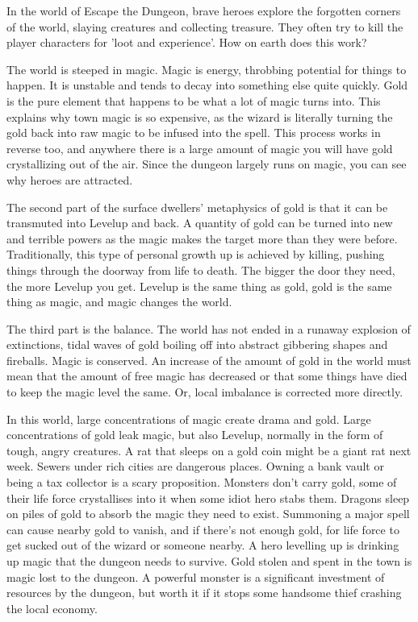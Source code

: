 \documentclass{tufte-book}
\begin{document}
In the world of Escape the Dungeon, brave heroes explore the forgotten corners of the world, slaying creatures and collecting treasure.  They often try to kill the player characters for 'loot and experience'. How on earth does this work?

The world is steeped in magic. Magic is energy, throbbing potential for things to happen. It is unstable and tends to decay into something else quite quickly. Gold is the pure element that happens to be what a lot of magic turns into. This explains why town magic is so expensive, as the wizard is literally turning the gold back into raw magic to be infused into the spell. This process works in reverse too, and anywhere there is a large amount of magic you will have gold crystallizing out of the air. Since the dungeon largely runs on magic, you can see why heroes are attracted.

The second part of the surface dwellers' metaphysics of gold is that it can be transmuted into Levelup and back. A quantity of gold can be turned into new and terrible powers as the magic makes the target more than they were before. Traditionally, this type of personal growth up is achieved by killing, pushing things through the doorway from life to death. The bigger the door they need, the more Levelup you get. Levelup is the same thing as gold, gold is the same thing as magic, and magic changes the world.

The third part is the balance. The world has not ended in a runaway explosion of extinctions, tidal waves of gold boiling off into abstract gibbering shapes and fireballs. Magic is conserved. An increase of the amount of gold in the world must mean that the amount of free magic has decreased or that some things have died to keep the magic level the same. Or, local imbalance is corrected more directly.

In this world, large concentrations of magic create drama and gold. Large concentrations of gold leak magic, but also Levelup, normally in the form of tough, angry creatures. A rat that sleeps on a gold coin might be a giant rat next week. Sewers under rich cities are dangerous places. Owning a bank vault or being a tax collector is a scary proposition. Monsters don't carry gold, some of their life force crystallises into it when some idiot hero stabs them. Dragons sleep on piles of gold to absorb the magic they need to exist. Summoning a major spell can cause nearby gold to vanish, and if there's not enough gold, for life force to get sucked out of the wizard or someone nearby. A hero levelling up is drinking up magic that the dungeon needs to survive. Gold stolen and spent in the town is magic lost to the dungeon. A powerful monster is a significant investment of resources by the dungeon, but worth it if it stops some handsome thief crashing the local economy.
\end{document}
